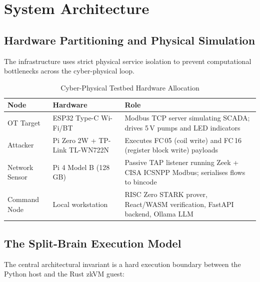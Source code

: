 \documentclass[12pt,a4paper]{article}
\begin{document}
\section{System Architecture}

\subsection{Hardware Partitioning and Physical Simulation}

The infrastructure uses strict physical service isolation to prevent
computational bottlenecks across the cyber-physical loop.

\begin{table}[htbp]
\centering
\caption{Cyber-Physical Testbed Hardware Allocation}
\label{tab:hardware}
\begin{tabular}{@{}llp{7cm}@{}}
\toprule
\textbf{Node} & \textbf{Hardware} & \textbf{Role} \\
\midrule
OT Target         & ESP32 Type-C Wi-Fi/BT & Modbus TCP server simulating SCADA;
                                             drives 5\,V pumps and LED indicators \\
Attacker           & Pi Zero 2W + TP-Link TL-WN722N & Executes FC\,05 (coil write) and
                                                       FC\,16 (register block write) payloads \\
Network Sensor     & Pi 4 Model B (128\,GB) & Passive TAP listener running Zeek +
                                              CISA ICSNPP Modbus; serialises flows
                                              to bincode \\
Command Node       & Local workstation & RISC Zero STARK prover, React/WASM
                                         verification, FastAPI backend, Ollama LLM \\
\bottomrule
\end{tabular}
\end{table}

\subsection{The Split-Brain Execution Model}

The central architectural invariant is a hard execution boundary between
the Python host and the Rust zkVM guest:
\end{document}
